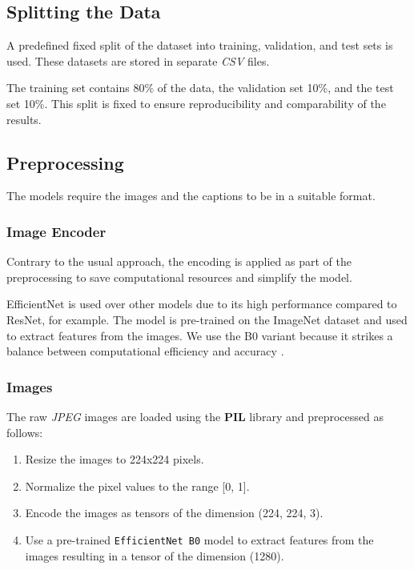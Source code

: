 \documentclass[12pt]{article}
\theoremstyle{plain}
\theoremstyle{definition}
\theoremstyle{remark}
\begin{document}
\subsection{Splitting the Data}\label{sec:splitting}
A predefined fixed split of the dataset into training, validation, and test sets is used. These datasets are stored in separate \textit{CSV} files.
\par The training set contains 80\% of the data, the validation set 10\%, and the test set 10\%. This split is fixed to ensure reproducibility and comparability of the results.


\subsection{Preprocessing}\label{sec:preprocessing}
The models require the images and the captions to be in a suitable format.

\subsubsection{Image Encoder}\label{sec:image-encoder}
Contrary to the usual approach, the encoding is applied as part of the preprocessing to save computational resources and simplify the model.
\par EfficientNet is used over other models due to its high performance compared to ResNet, for example. The model is pre-trained on the ImageNet dataset and used to extract features from the images. We use the B0 variant because it strikes a balance between computational efficiency and accuracy \cite{tan2019efficientnet}.

\subsubsection{Images}\label{sec:images}
The raw \textit{JPEG} images are loaded using the \textbf{PIL} library and preprocessed as follows:
\begin{enumerate}
    \item Resize the images to 224x224 pixels.
    \item Normalize the pixel values to the range [0, 1].
    \item Encode the images as tensors of the dimension (224, 224, 3).
    \item Use a pre-trained \texttt{EfficientNet B0} model to extract features from the images resulting in a tensor of the dimension (1280).
\end{enumerate}
\end{document}
